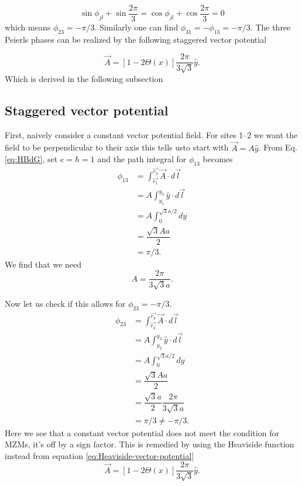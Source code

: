 \begin{equation}
  \sin\phi_{jl} + \sin\dfrac{2\pi}{3} = \cos\phi_{jl} + \cos\dfrac{2\pi}{3} = 0
\end{equation}
which means $\phi_{23} = -\pi/3$.
Similarly one can find $\phi_{31} = -\phi_{13} = -\pi/3$.
The three Peierls phases can be realized by the following staggered vector potential

\begin{equation}\label{eq:Heaviside-vector-potential}
  \vec{A} = [1-2\Theta(x)] \dfrac{2\pi}{3\sqrt{3}}\hat{y}.
\end{equation}
Which is derived in the following subsection

\subsection{Staggered vector potential}

First, naively consider a constant vector potential field.
For sites 1--2 we want the field to be perpendicular to their axis this tells usto start with $\vec{A} = A\hat{y}$.
From Eq. \ref{eq:HBdG}, set $e=\hbar=1$ and the path integral for $\phi_{13}$ becomes
\begin{align}
  \phi_{13} &= \int_{\vec{r_1}}^{\vec{r_3}} \vec{A} \cdot d\vec{l} \nonumber \\
  &= A \int_{y_1}^{y_3} \hat{y} \cdot d\vec{l} \nonumber \\
  &= A \int_0^{\sqrt{3}a/2} dy \nonumber \\
  &= \dfrac{\sqrt{3} A a}{2} \nonumber \\
  &= \pi/3. \nonumber
\end{align}
We find that we need
\begin{equation} \label{constant vector potential magnitude}
  A = \dfrac{2 \pi}{3 \sqrt{3} a}.
\end{equation}

Now let us check if this allows for $\phi_{23} = -\pi/3$.
\begin{align}
  \phi_{23} &= \int_{\vec{r_2}}^{\vec{r_3}} \vec{A} \cdot d\vec{l} \nonumber \\
  &= A \int_{y_2}^{y_3} \hat{y} \cdot d\vec{l} \nonumber \\
  &= A \int^{\sqrt{3}a/2}_0 dy \nonumber \\
  &= \dfrac{\sqrt{3} A a}{2} \nonumber \\
  &= \dfrac{\sqrt{3} a}{2} \dfrac{2 \pi}{3 \sqrt{3} a} \nonumber \\
  &= \pi/3 \neq -\pi/3. \nonumber
\end{align}
Here we see that a constant vector potential does not meet the condition for MZMs, it's off by a sign factor.
This is remedied by using the Heaviside function instead from equation \ref{eq:Heaviside-vector-potential}
\begin{equation}
  \vec{A} = [1-2\Theta(x)] \dfrac{2\pi}{3\sqrt{3}}\hat{y}. \nonumber
\end{equation}

